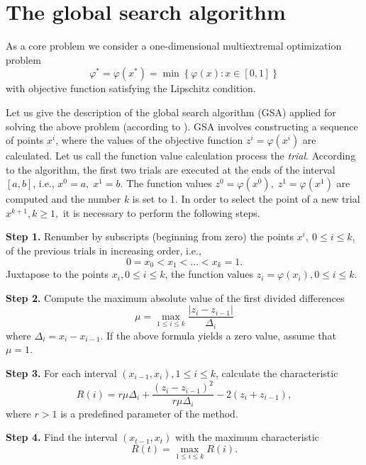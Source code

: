 \documentclass[runningheads]{llncs}
\begin{document}
\section{The global search algorithm}
\label{SectionCore}

As a core problem we consider a one-dimensional multiextremal optimization 
problem
\begin{equation}\label{uni_problem}
\varphi^\ast = \varphi(x^\ast)=\min{\left\{\varphi(x):x\in \left[0,1\right] 
\right\}}
\end{equation}
with objective function satisfying the Lipschitz condition. 

Let us give the description of the global search algorithm (GSA) applied for 
solving the above problem (according to \cite{Strongin2000}). 
GSA involves constructing a sequence of points $x^i$, where the values of the 
objective function $z^i=\varphi(x^i)$ are calculated. Let us call the 
function value calculation process the \textit{trial}. 
According to the algorithm, the first two trials are executed at the ends of 
the interval  $[a,b]$, i.e., $x^0=a,\;x^1=b$. The function values $z^0=\varphi
(x^0),\;z^1=\varphi(x^1)$  are computed and the number $k$ is set to 1. In 
order to select the point of a new trial $x^{k+1}, k\geq 1,$  it is necessary 
to perform the following steps.

\textbf{Step 1.} Renumber by subscripts (beginning from zero) the points $x^i,
\:0\leq i\leq k$, of the previous trials in increasing order, i.e.,
\[
0=x_0<x_1<\ldots <x_{k}=1.
\] 
Juxtapose to the points $x_i, 0\leq i\leq k$,  the function values $z_i=
\varphi(x_i), 0\leq i\leq k$.

\textbf{Step 2.} Compute the maximum absolute value of the first divided 
differences 
\begin{equation}\label{mu}
\mu=\max_{1\leq i\leq k}\frac{\left|z_i-z_{i-1}\right|}{\Delta_i}
\end{equation}
where $\Delta_i = x_i-x_{i-1}$. If the above formula yields a zero value, 
assume that $\mu = 1$.

\textbf{Step 3.} For each interval $(x_{i-1},x_i),1\leq i\leq k$,  calculate 
the characteristic
\begin{equation}\label{R}
R(i)=r\mu\Delta_i+\frac{(z_i-z_{i-1})^2}{r\mu\Delta_i}-2(z_i+z_{i-1}),
\end{equation} 
where $r>1$ is a predefined parameter of the method. 

\textbf{Step 4.} Find the interval $(x_{t-1},x_t)$ with the maximum 
characteristic
\begin{equation}\label{MaxR}
R(t)=\max_{1\leq i\leq {k}}R(i).
\end{equation}  
\end{document}
